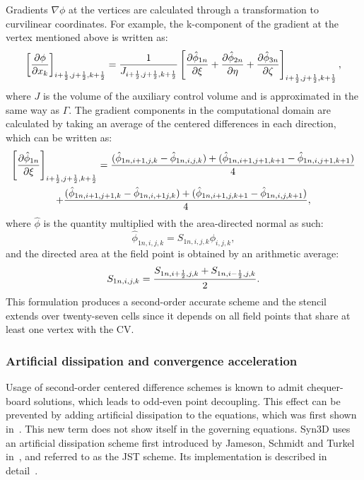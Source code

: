 Gradients $\nabla \phi$ at the vertices are calculated through a transformation to curvilinear coordinates. For example, the k-component of the gradient at the vertex mentioned above is written as:
\begin{equation}
    \left[ \pdiff{\phi}{x_k} \right]_{i+\half,j+\half,k+\half} =
        \frac{1}{J_{i+\half,j+\half,k+\half}}
        \left[
            \pdiff{\hat{\phi}_{1n}}{\xi} + \pdiff{\hat{\phi}_{2n}}{\eta} + \pdiff{\hat{\phi}_{3n}}{\zeta}
        \right]_{i+\half,j+\half,k+\half}
    \label{eq:velgradvertex},
\end{equation}
where $J$ is the volume of the auxiliary control volume and is approximated in the same way as $\Gamma$. The gradient components in the computational domain are calculated by taking an average of the centered differences in each direction, which can be written as:
\begin{gather*}
    \left[
        \pdiff{\hat{\phi}_{1n}}{\xi}
    \right]_{i+\half,j+\half,k+\half}
    = \frac{
        (\hat{\phi}_{1n,i+1,j,k} - \hat{\phi}_{1n,i,j,k})
      + (\hat{\phi}_{1n,i+1,j+1,k+1} - \hat{\phi}_{1n,i,j+1,k+1})
    }{4}\\
    + \frac{
        (\hat{\phi}_{1n,i+1,j+1,k} - \hat{\phi}_{1n,i,+1j,k})
      + (\hat{\phi}_{1n,i+1,j,k+1} - \hat{\phi}_{1n,i,j,k+1})
    }{4},
\end{gather*}
where $\hat{\phi}$ is the quantity multiplied with the area-directed normal as such:
\begin{equation*}
    \hat{\phi}_{1n,i,j,k} = S_{1n,i,j,k}\phi_{i,j,k},
\end{equation*}
and the directed area at the field point is obtained by an arithmetic average:
\begin{equation*}
    S_{1n,i,j,k} = \frac{S_{1n,i+\frac{1}{2},j,k} + S_{1n,i-\frac{1}{2},j,k}}{2}.
\end{equation*}
This formulation produces a second-order accurate scheme and the stencil extends over twenty-seven cells since it depends on all field points that share at least one vertex with the CV.
%
\subsubsection{Artificial dissipation and convergence acceleration}
Usage of second-order centered difference schemes is known to admit chequer-board solutions, which leads to odd-even point decoupling. This effect can be prevented by adding artificial dissipation to the equations, which was first shown in~\cite{vonneumann1950method}. This new term does not show itself in the governing equations. Syn3D uses an artificial dissipation scheme first introduced by Jameson, Schmidt and Turkel in~\cite{jameson1981numerical}, and referred to as the JST scheme. Its implementation is described in detail~\cite{nadarajah2003discrete}.

